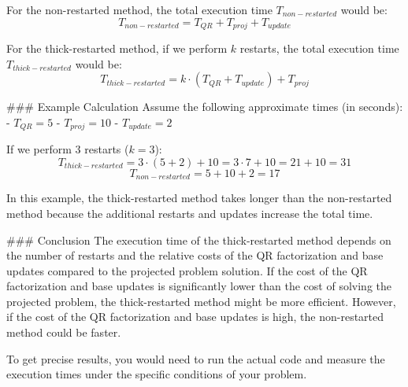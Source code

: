 For the non-restarted method, the total execution time \( T_{non-restarted} \) would be:
\[ T_{non-restarted} = T_{QR} + T_{proj} + T_{update} \]

For the thick-restarted method, if we perform \( k \) restarts, the total execution time \( T_{thick-restarted} \) would be:
\[ T_{thick-restarted} = k \cdot (T_{QR} + T_{update}) + T_{proj} \]

### Example Calculation
Assume the following approximate times (in seconds):
- \( T_{QR} = 5 \)
- \( T_{proj} = 10 \)
- \( T_{update} = 2 \)

If we perform 3 restarts (\( k = 3 \)):
\[ T_{thick-restarted} = 3 \cdot (5 + 2) + 10 = 3 \cdot 7 + 10 = 21 + 10 = 31 \]
\[ T_{non-restarted} = 5 + 10 + 2 = 17 \]

In this example, the thick-restarted method takes longer than the non-restarted method because the additional restarts and updates increase the total time.

### Conclusion
The execution time of the thick-restarted method depends on the number of restarts and the relative costs of the QR factorization and base updates compared to the projected problem solution. If the cost of the QR factorization and base updates is significantly lower than the cost of solving the projected problem, the thick-restarted method might be more efficient. However, if the cost of the QR factorization and base updates is high, the non-restarted method could be faster.

To get precise results, you would need to run the actual code and measure the execution times under the specific conditions of your problem.